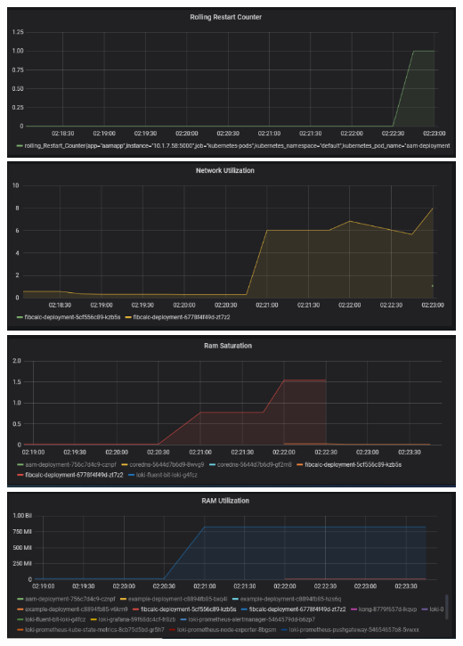\documentclass[a4paper,10pt]{scrartcl}
\begin{document}
\begin{description}
\begin{minipage}{\linewidth}
            \includegraphics[width=.5\textwidth]{img/RAMAnomalie/RollingRestart.PNG}
            \includegraphics[width=.5\textwidth]{img/RAMAnomalie/Netzwerk.PNG}
            \includegraphics[scale=1,width=.5\textwidth,height=.14\textheight]{img/RAMAnomalie/RAMSaturation.PNG}
  			\includegraphics[scale=1,width=.5\textwidth]{img/RAMAnomalie/RAMUtilization.PNG} 
\end{minipage}


\end{description}
\end{document}

